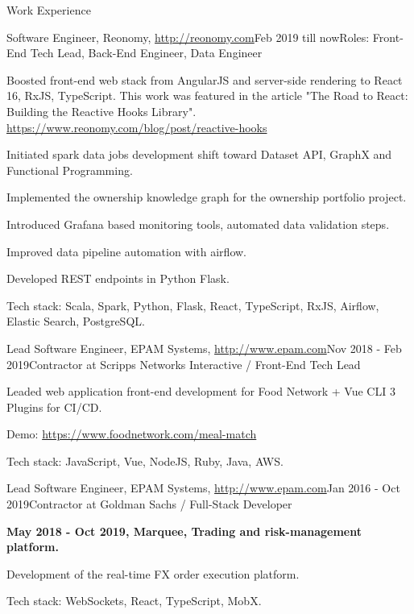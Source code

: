 \documentclass{resume}
\begin{document}
\begin{rSection}{Work Experience}

\begin{rSubsection}{Software Engineer, Reonomy, \url{http://reonomy.com}}{Feb 2019 till now}{Roles: Front-End Tech Lead, Back-End Engineer, Data Engineer}{}
\item Boosted front-end web stack from AngularJS and server-side rendering to React 16, RxJS, TypeScript.
This work was featured in the article "The Road to React: Building the Reactive Hooks Library".
\url{https://www.reonomy.com/blog/post/reactive-hooks}
\item Initiated spark data jobs development shift toward Dataset API, GraphX and Functional Programming.
\item Implemented the ownership knowledge graph for the ownership portfolio project.
\item Introduced Grafana based monitoring tools, automated data validation steps.
\item Improved data pipeline automation with airflow.
\item Developed REST endpoints in Python Flask.

Tech stack: Scala, Spark, Python, Flask, React, TypeScript, RxJS, Airflow, Elastic Search, PostgreSQL.
\end{rSubsection}

\begin{rSubsection}{Lead Software Engineer, EPAM Systems, \url{http://www.epam.com}}{Nov 2018 - Feb 2019}{Contractor at Scripps Networks Interactive / Front-End Tech Lead}{}
\item Leaded web application front-end development for Food Network + Vue CLI 3 Plugins for CI/CD.

Demo: \url{https://www.foodnetwork.com/meal-match}

Tech stack: JavaScript, Vue, NodeJS, Ruby, Java, AWS.
\end{rSubsection}

\begin{rSubsection}{Lead Software Engineer, EPAM Systems, \url{http://www.epam.com}}{Jan 2016 - Oct 2019}{Contractor at Goldman Sachs / Full-Stack Developer}{}
\item[] \textbf{May 2018 - Oct 2019, Marquee, Trading and risk-management platform.}
\item Development of the real-time FX order execution platform.

Tech stack: WebSockets, React, TypeScript, MobX.


\end{rSubsection}
\end{rSection}
\end{document}
